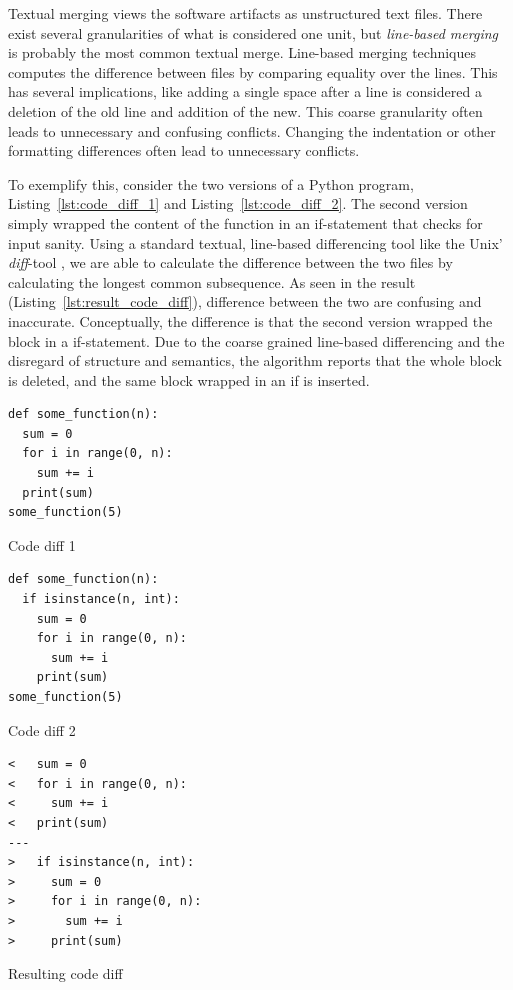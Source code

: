 \documentclass[a4paper,english]{ifimaster}
\begin{document}
Textual merging views the software artifacts as unstructured text files. There exist several granularities of what is considered one unit, but \textit{line-based merging} is probably the most common textual merge. Line-based merging techniques computes the difference between files by comparing equality over the lines. This has several implications, like adding a single space after a line is considered a deletion of the old line and addition of the new. This coarse granularity often leads to unnecessary and confusing conflicts. Changing the indentation or other formatting differences often lead to unnecessary conflicts.

To exemplify this, consider the two versions of a Python program, Listing~\vref{lst:code_diff_1} and Listing~\vref{lst:code_diff_2}. The second version simply wrapped the content of the function in an if-statement that checks for input sanity. Using a standard textual, line-based differencing tool like the Unix' \textit{diff}-tool \cite{cite:fast_algo_for_lcs}, we are able to calculate the difference between the two files by calculating the longest common subsequence. As seen in the result (Listing~\vref{lst:result_code_diff}), difference between the two are confusing and inaccurate. Conceptually, the difference is that the second version wrapped the block in a if-statement. Due to the coarse grained line-based differencing and the disregard of structure and semantics, the algorithm reports that the whole block is deleted, and the same block wrapped in an if is inserted.

\begin{listing}
	\begin{verbatim}
def some_function(n):
  sum = 0
  for i in range(0, n):
    sum += i
  print(sum)
some_function(5)

  \end{verbatim}
	\caption{Code diff 1}
	\label{lst:code_diff_1}
\end{listing}

\begin{listing}
	\begin{verbatim}
def some_function(n):
  if isinstance(n, int):
    sum = 0
    for i in range(0, n):
      sum += i
    print(sum)
some_function(5)
  \end{verbatim}
	\caption{Code diff 2}
	\label{lst:code_diff_2}
\end{listing}

\begin{listing}
	\begin{verbatim}
<   sum = 0
<   for i in range(0, n):
<     sum += i
<   print(sum)
---
>   if isinstance(n, int):
>     sum = 0
>     for i in range(0, n):
>       sum += i
>     print(sum)
  \end{verbatim}
	\caption{Resulting code diff}
	\label{lst:result_code_diff}
\end{listing}
\end{document}
